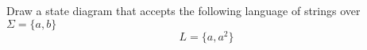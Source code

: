 Draw a state diagram that accepts the following
language of strings over $\Sigma =
\{ a, b \}$ 
\[
L = \{a, a^2\}
\]
